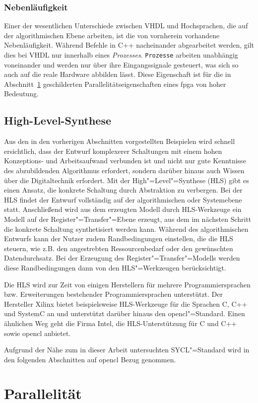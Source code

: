 \subsubsection{Nebenläufigkeit}

Einer der wesentlichen Unterschiede zwischen VHDL und Hochsprachen, die auf
der algorithmischen Ebene arbeiten, ist die von vornherein vorhandene
Nebenläufigkeit. Während Befehle in C++ nacheinander abgearbeitet werden, gilt
dies bei VHDL nur innerhalb eines \textit{Prozesses}. \texttt{Prozesse} arbeiten
unabhängig voneinander und werden nur über ihre Eingangssignale gesteuert, was
sich so auch auf die reale Hardware abbilden lässt. Diese Eigenschaft ist für
die in Abschnitt~\ref{fpga:parallelitaet} geschilderten
Parallelitätseigenschaften eines \gls{fpga} von hoher Bedeutung.
\cite[vgl.][25]{kesel2013}

\subsection{High-Level-Synthese}

Aus den in den vorherigen Abschnitten vorgestellten Beispielen wird schnell
ersichtlich, dass der Entwurf komplexerer Schaltungen mit einem hohen
Konzeptions- und Arbeitsaufwand verbunden ist und nicht nur gute Kenntnisse des 
abzubildenden Algorithmus erfordert, sondern darüber hinaus auch Wissen über die
Digitaltechnik erfordert. Mit der High"=Level"=Synthese (HLS) gibt es einen
Ansatz, die konkrete Schaltung durch Abstraktion zu verbergen. Bei der HLS
findet der Entwurf vollständig auf der algorithmischen oder Systemebene statt.
Anschließend wird aus dem erzeugten Modell durch HLS-Werkzeuge ein Modell auf
der Register"=Transfer"=Ebene erzeugt, aus dem im nächsten Schritt die konkrete
Schaltung synthetisiert werden kann. Während des algorithmischen Entwurfs kann
der Nutzer zudem Randbedingungen einstellen, die die HLS steuern, wie z.B. den
angestrebten Ressourcenbedarf oder den gewünschten Datendurchsatz. Bei der
Erzeugung des Register"=Transfer"=Modells werden diese Randbedingungen dann von
den HLS"=Werkzeugen berücksichtigt. \cite[vgl.][482]{kesel2013}

Die HLS wird zur Zeit von einigen Herstellern für mehrere Programmiersprachen
bzw. Erweiterungen bestehender Programmiersprachen unterstützt. Der Hersteller
Xilinx bietet beispielsweise HLS-Werkzeuge für die Sprachen C, C++ und SystemC
an und unterstützt darüber hinaus den \gls{opencl}"=Standard. Einen ähnlichen
Weg geht die Firma Intel, die HLS-Unterstützung für C und C++ sowie
\gls{opencl} anbietet.

Aufgrund der Nähe zum in dieser Arbeit untersuchten SYCL"=Standard wird in den
folgenden Abschnitten auf \gls{opencl} Bezug genommen.

\section{Parallelität}\label{fpga:parallelitaet}

